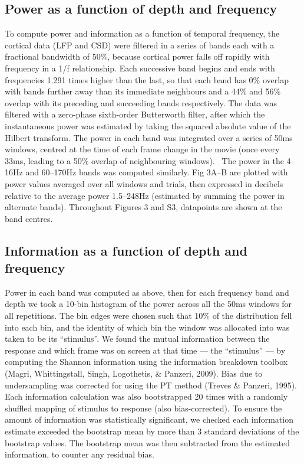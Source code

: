 \subsection[Power as a function of depth and frequency]{Power as a function of depth and frequency}
To compute power and information as a function of temporal frequency, the cortical data (\ac{LFP} and \ac{CSD}) were filtered in a series of bands each with a fractional bandwidth of 50\%, because cortical power falls off rapidly with frequency in a 1/f relationship. Each successive band begins and ends with frequencies 1.291 times higher than the last, so that each band has 0\% overlap with bands further away than its immediate neighbours and a 44\% and 56\% overlap with its preceding and succeeding bands respectively. The data was filtered with a zero-phase sixth-order Butterworth filter, after which the instantaneous power was estimated by taking the squared absolute value of the Hilbert transform. The power in each band was integrated over a series of 50ms windows, centred at the time of each frame change in the movie (once every 33ms, leading to a 50\% overlap of neighbouring windows). \ The power in the 4--16Hz and 60--170Hz bands was computed similarly. Fig 3A--B are plotted with power values averaged over all windows and trials, then expressed in decibels relative to the average power 1.5--248Hz (estimated by summing the power in alternate bands). Throughout Figures 3 and S3, datapoints are shown at the band centres.

\subsection{Information as a function of depth and frequency}
Power in each band was computed as above, then for each frequency band and depth we took a 10-bin histogram of the power across all the 50ms windows for all repetitions. The bin edges were chosen such that 10\% of the distribution fell into each bin, and the identity of which bin the window was allocated into was taken to be its ``stimulus''. We found the mutual information between the response and which frame was on screen at that time --- the ``stimulus'' --- by computing the Shannon information using the information breakdown toolbox (Magri, Whittingstall, Singh, Logothetis, \& Panzeri, 2009). Bias due to undersampling was corrected for using the \ac{PT} method (Treves \& Panzeri, 1995). Each information calculation was also bootstrapped 20 times with a randomly shuffled mapping of stimulus to response (also bias-corrected). To ensure the amount of information was statistically significant, we checked each information estimate exceeded the bootstrap mean by more than 3 standard deviations of the bootstrap values. The bootstrap mean was then subtracted from the estimated information, to counter any residual bias.

